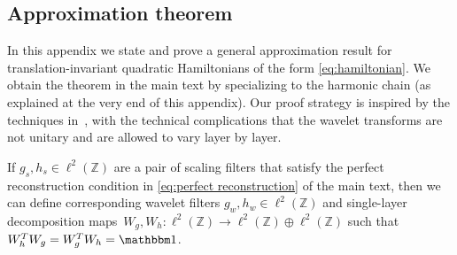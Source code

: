 \documentclass[submission, Phys]{SciPost}
\theoremstyle{definition}
\theoremstyle{remark}
\newcommand{\ZZ}{\mathbb Z}
\newcommand{\op}{\oplus}
\newcommand{\id}{\mathbbm 1}
\begin{document}
\begin{appendix}
\section{Approximation theorem}\label{sec:approximation}

In this appendix we state and prove a general approximation result for translation-invariant quadratic Hamiltonians of the form \cref{eq:hamiltonian}.
We obtain the theorem in the main text by specializing to the harmonic chain (as explained at the very end of this appendix).
Our proof strategy is inspired by the techniques in~\cite{haegeman2018rigorous}, with the technical complications that the wavelet transforms are not unitary and are allowed to vary layer by layer.

If $g_s,h_s\in\ell^2(\ZZ)$ are a pair of scaling filters that satisfy the perfect reconstruction condition in \cref{eq:perfect reconstruction} of the main text, then we can define corresponding wavelet filters $g_w,h_w\in\ell^2(\ZZ)$ and single-layer decomposition maps~$W_g, W_h \colon \ell^2(\ZZ) \to \ell^2(\ZZ) \op \ell^2(\ZZ)$ such that $W_h^T W_g = W_g^T W_h = \id$.


\end{appendix}
\end{document}
